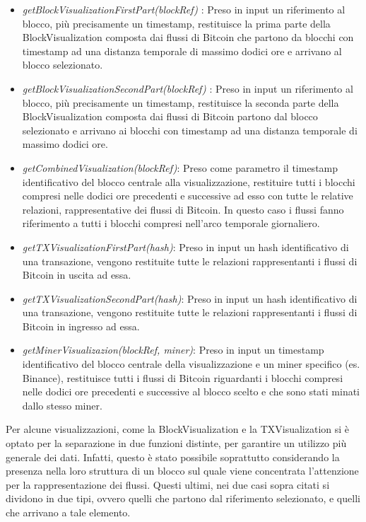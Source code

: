 \begin{itemize}
    \item \emph{getBlockVisualizationFirstPart(blockRef)} : Preso in input un riferimento al blocco, più precisamente un timestamp, restituisce la prima parte della BlockVisualization composta dai flussi di Bitcoin che partono da blocchi con timestamp ad una distanza temporale di massimo dodici ore e arrivano al blocco selezionato.

    \item \emph{getBlockVisualizationSecondPart(blockRef)} : Preso in input un riferimento al blocco, più precisamente un timestamp, restituisce la seconda parte della BlockVisualization composta dai flussi di Bitcoin partono dal blocco selezionato e arrivano ai blocchi con timestamp ad una distanza temporale di massimo dodici ore.

    \item 
    \emph{getCombinedVisualization(blockRef)}: Preso come parametro il timestamp identificativo del blocco centrale alla visualizzazione, restituire tutti i blocchi compresi nelle dodici ore precedenti e successive ad esso con tutte le relative relazioni, rappresentative dei flussi di Bitcoin. In questo caso i flussi fanno riferimento a tutti i blocchi compresi nell'arco temporale giornaliero.
\thispagestyle{mystyle}
    \item 
    \emph{getTXVisualizationFirstPart(hash)}: Preso in input un hash identificativo di una transazione, vengono restituite tutte le relazioni rappresentanti i flussi di Bitcoin in uscita ad essa.

    \item 
    \emph{getTXVisualizationSecondPart(hash)}: Preso in input un hash identificativo di una transazione, vengono restituite tutte le relazioni rappresentanti i flussi di Bitcoin in ingresso ad essa.
    
    \item 
    \emph{getMinerVisualizazion(blockRef, miner)}: Preso in input un timestamp identificativo del blocco centrale della visualizzazione e un miner specifico (es. Binance), restituisce tutti i flussi di Bitcoin riguardanti i blocchi compresi nelle dodici ore precedenti e successive al blocco scelto e che sono stati minati dallo stesso miner.
\end{itemize}

Per alcune visualizzazioni, come la BlockVisualization e la TXVisualization si è optato per la separazione in due funzioni distinte, per garantire un utilizzo più generale dei dati.
Infatti, questo è stato possibile soprattutto considerando la presenza nella loro struttura di un blocco sul quale viene concentrata l'attenzione per la rappresentazione dei flussi.
Questi ultimi, nei due casi sopra citati si dividono in due tipi, ovvero quelli che partono dal riferimento selezionato, e quelli che arrivano a tale elemento.

